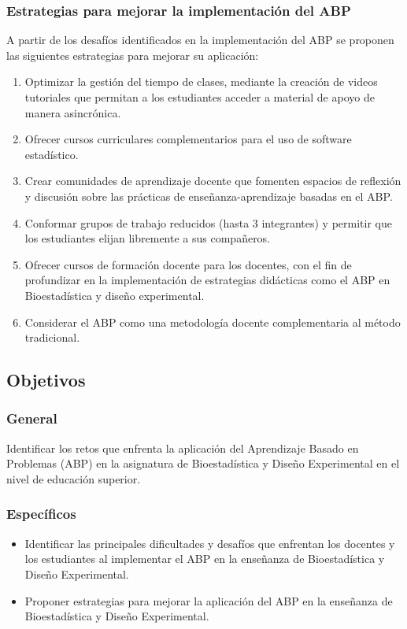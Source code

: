\subsubsection{Estrategias para mejorar la implementación del ABP}

A partir de los desafíos identificados en la implementación del ABP se proponen las siguientes estrategias para mejorar su aplicación:
\begin{enumerate}
	\item Optimizar la gestión del tiempo de clases, mediante la creación de videos tutoriales que permitan a los estudiantes acceder a material de apoyo de manera asincrónica.
	\item Ofrecer cursos curriculares complementarios para el uso de software estadístico.
	\item Crear comunidades de aprendizaje docente que fomenten espacios de reflexión y discusión sobre las prácticas de enseñanza-aprendizaje basadas en el ABP.
	\item Conformar grupos de trabajo reducidos (hasta 3 integrantes) y permitir que los estudiantes elijan libremente a sus compañeros.
	\item Ofrecer cursos de formación docente para los docentes, con el fin de profundizar en la implementación de estrategias didácticas como el ABP en Bioestadística y diseño experimental.
	\item Considerar el ABP como una metodología docente complementaria al método tradicional.
\end{enumerate}

\subsection{Objetivos}

\subsubsection{General}

Identificar los retos que enfrenta la aplicación del Aprendizaje Basado en Problemas (ABP) en la asignatura de Bioestadística y Diseño Experimental en el nivel de educación superior.

\subsubsection{Específicos}

\begin{itemize}
	\item Identificar las principales dificultades y desafíos que enfrentan los docentes y los estudiantes al implementar el ABP en la enseñanza de Bioestadística y Diseño Experimental.
	\item Proponer estrategias para mejorar la aplicación del ABP en la enseñanza de Bioestadística y Diseño Experimental.
\end{itemize}

